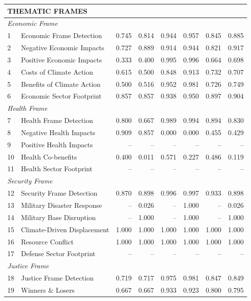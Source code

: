 {\begin{longtable}{p{0.4cm}p{5.5cm}rrrrrr}
\multicolumn{8}{l}{\cellcolor{gray!10}\textbf{THEMATIC FRAMES}} \\
\midrule
\multicolumn{8}{l}{\textit{Economic Frame}} \\
1 & Economic Frame Detection & 0.745 & 0.814 & 0.944 & 0.957 & 0.845 & 0.885 \\
2 & Negative Economic Impacts & 0.727 & 0.889 & 0.914 & 0.944 & 0.821 & 0.917 \\
3 & Positive Economic Impacts & 0.333 & 0.400 & 0.995 & 0.996 & 0.664 & 0.698 \\
4 & Costs of Climate Action & 0.615 & 0.500 & 0.848 & 0.913 & 0.732 & 0.707 \\
5 & Benefits of Climate Action & 0.500 & 0.516 & 0.952 & 0.981 & 0.726 & 0.749 \\
6 & Economic Sector Footprint & 0.857 & 0.857 & 0.938 & 0.950 & 0.897 & 0.904 \\
\multicolumn{8}{l}{\textit{Health Frame}} \\
7 & Health Frame Detection & 0.800 & 0.667 & 0.989 & 0.994 & 0.894 & 0.830 \\
8 & Negative Health Impacts & 0.909 & 0.857 & 0.000 & 0.000 & 0.455 & 0.429 \\
9 & Positive Health Impacts & -- & -- & -- & -- & -- & -- \\
10 & Health Co-benefits & 0.400 & 0.011 & 0.571 & 0.227 & 0.486 & 0.119 \\
11 & Health Sector Footprint & -- & -- & -- & -- & -- & -- \\
\multicolumn{8}{l}{\textit{Security Frame}} \\
12 & Security Frame Detection & 0.870 & 0.898 & 0.996 & 0.997 & 0.933 & 0.898 \\
13 & Military Disaster Response & -- & 0.026 & -- & 1.000 & -- & 0.026 \\
14 & Military Base Disruption & -- & 1.000 & -- & 1.000 & -- & 1.000 \\
15 & Climate-Driven Displacement & 1.000 & 1.000 & 1.000 & 1.000 & 1.000 & 1.000 \\
16 & Resource Conflict & 1.000 & 1.000 & 1.000 & 1.000 & 1.000 & 1.000 \\
17 & Defense Sector Footprint & -- & -- & -- & -- & -- & -- \\
\multicolumn{8}{l}{\textit{Justice Frame}} \\
18 & Justice Frame Detection & 0.719 & 0.717 & 0.975 & 0.981 & 0.847 & 0.849 \\
19 & Winners \& Losers & 0.667 & 0.667 & 0.933 & 0.923 & 0.800 & 0.795 \\

\end{longtable}}
